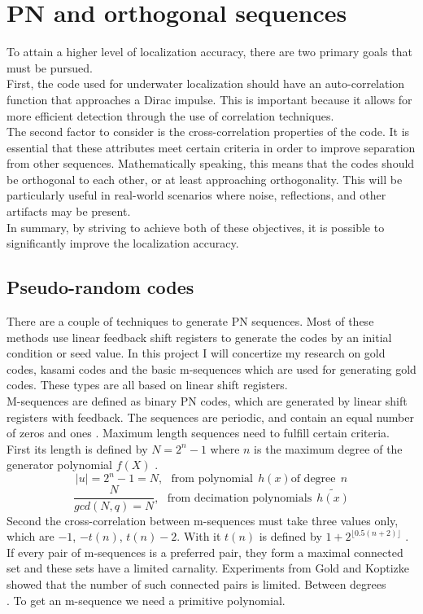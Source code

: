 \chapter{PN and orthogonal sequences}

To attain a higher level of localization accuracy, there are two primary goals that must be pursued.\\
First, the code used for underwater localization should have an auto-correlation function that approaches a Dirac impulse. This is important because it allows for more efficient detection through the use of correlation techniques.\\
The second factor to consider is the cross-correlation properties of the code. It is essential that these attributes meet certain criteria in order to improve separation from other sequences. Mathematically speaking, this means that the codes should be orthogonal to each other, or at least approaching orthogonality. This will be particularly useful in real-world scenarios where noise, reflections, and other artifacts may be present.\\
In summary, by striving to achieve both of these objectives, it is possible to significantly improve the localization accuracy.

\section{Pseudo-random codes}

There are a couple of techniques to generate PN sequences. Most of these methods use linear feedback shift registers to generate the codes by an initial condition or seed value. In this project I will concertize my research on gold codes, kasami codes and the basic m-sequences which are used for generating gold codes. These types are all based on linear shift registers.\\
M-sequences are defined as binary PN codes, which are generated by linear shift registers with feedback. The sequences are periodic, and contain an equal number of zeros and ones \cite{proakis08}. 
Maximum length sequences need to fulfill certain criteria.  First its length is defined by $N=2^n - 1$ where $n$ is the maximum degree of the generator polynomial $f(X)$ \cite{sarwate80}.
 \begin{equation}
	 \lvert u\rvert=2^n-1=N,~~~\text{from polynomial}~~h(x) \text{of degree}~~n
\end{equation}
\begin{equation}
	\dfrac{N}{gcd(N,q)=N},~~~\text{from decimation polynomials}~~\widetilde{h(x)}
\end{equation}
Second the cross-correlation between m-sequences must take three values only, which are $-1$, $-t(n)$, $t(n) - 2$. With it $t(n)$ is defined by $1+2^{\lfloor0.5(n+2)\rfloor}$ \cite{sarwate80}.
If every pair of m-sequences is a preferred pair, they form a maximal connected set and these sets have a limited carnality. Experiments from Gold and Koptizke showed that the number of such connected pairs is limited. Between degrees $$$$ \cite{gold65}. To get an m-sequence we need a primitive polynomial. 

